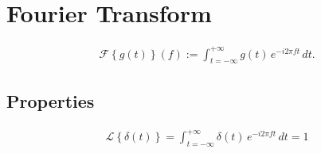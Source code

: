 \documentclass[letterpaper,10pt,english]{jupyterBook}
\begin{document}
\section{Fourier Transform}
\label{\detokenize{ch/complex/fourier:fourier-transform}}\label{\detokenize{ch/complex/fourier:complex-fourier-ft}}\begin{equation*}
\begin{split}\mathscr{F}\left\{ g(t) \right\}(f) := \int_{t = -\infty}^{+\infty} g(t) \, e^{-i 2 \pi f t} \, dt .\end{split}
\end{equation*}

\subsection{Properties}
\label{\detokenize{ch/complex/fourier:properties}}
\sphinxAtStartPar
{}

\sphinxAtStartPar
{}
\begin{equation*}
\begin{split}\mathscr{L}\left\{ \delta(t) \right\} = \int_{t=-\infty}^{+\infty} \delta(t) \, e^{-i 2 \pi f t} \, dt = 1 \end{split}
\end{equation*}
\sphinxAtStartPar
{}

\sphinxAtStartPar
{}

\sphinxAtStartPar
{}

\sphinxAtStartPar
{}

\sphinxAtStartPar
{}
\end{document}
